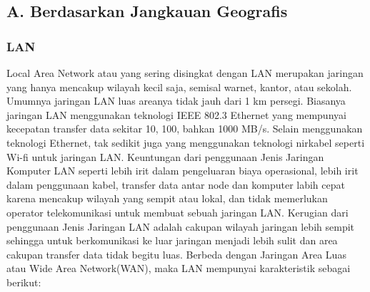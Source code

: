   \subsection{A. Berdasarkan Jangkauan Geografis}
    \subsubsection{LAN}
      Local Area Network atau yang sering disingkat dengan LAN merupakan jaringan yang hanya mencakup wilayah kecil saja, semisal warnet, kantor, atau sekolah. Umumnya jaringan LAN luas areanya tidak jauh dari 1 km persegi.
    Biasanya jaringan LAN menggunakan teknologi IEEE 802.3 Ethernet yang mempunyai kecepatan transfer data sekitar 10, 100, bahkan 1000 MB/s. Selain menggunakan teknologi Ethernet, tak sedikit juga yang menggunakan teknologi nirkabel seperti Wi-fi untuk jaringan LAN.
    Keuntungan dari penggunaan Jenis Jaringan Komputer LAN seperti lebih irit dalam pengeluaran biaya operasional, lebih irit dalam penggunaan kabel, transfer data antar node dan komputer labih cepat karena mencakup wilayah yang sempit atau lokal, dan tidak memerlukan operator telekomunikasi untuk membuat sebuah jaringan LAN.
    Kerugian dari penggunaan Jenis Jaringan LAN adalah cakupan wilayah jaringan lebih sempit sehingga untuk berkomunikasi ke luar jaringan menjadi lebih sulit dan area cakupan transfer data tidak begitu luas.
    Berbeda dengan Jaringan Area Luas atau Wide Area Network(WAN), maka LAN mempunyai karakteristik sebagai berikut:
